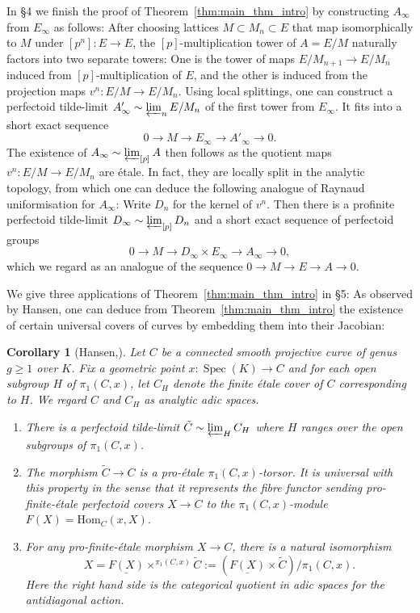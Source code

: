 \documentclass[10pt,oneside]{amsart}
\newtheorem{corollary}[theorem]{Corollary}
\theoremstyle{definition}
\newcommand{\Spec}{\operatorname{Spec}}
\begin{document}
In \S4 we finish the proof of Theorem~\ref{thm:main_thm_intro} by constructing $A_\infty$ from $E_\infty$ as follows: After choosing lattices $M\subset M_n\subset E$ that map isomorphically to $M$ under $[p^n]\colon E\rightarrow E$, the $[p]$-multiplication tower of $A=E/M$ naturally factors into two separate towers: One is the tower of maps $E/M_{n+1}\rightarrow E/M_n$ induced from $[p]$-multiplication of $E$, and the other is induced from the projection maps $v^n\colon E/M\rightarrow E/M_n$. Using local splittings, one can construct a perfectoid tilde-limit $A'_\infty\sim \varprojlim_n E/M_n$ of the first tower from $E_\infty$. It fits into a short exact sequence
\[0\to M\to E_\infty\to A'_\infty\to 0. \]
 The existence of $A_\infty\sim \varprojlim_{[p]}A$ then follows as the quotient maps $v^n\colon E/M\rightarrow E/M_n$ are \'etale. In fact, they are locally split in the analytic topology, from which one can deduce the following analogue of Raynaud uniformisation for $A_\infty$: Write $D_n$ for the kernel of $v^n$. Then there is a profinite perfectoid tilde-limit $D_\infty\sim \varprojlim_{[p]} D_n$ and a short exact sequence of perfectoid groups
\[0\rightarrow M\rightarrow D_\infty \times E_\infty \rightarrow A_\infty\rightarrow 0,\]
which we regard as an analogue of the sequence $0\rightarrow M\rightarrow E\rightarrow A\rightarrow 0$.

We give three applications of Theorem~\ref{thm:main_thm_intro} in \S 5:
As observed by Hansen, one can deduce from Theorem~\ref{thm:main_thm_intro} the existence of certain universal covers of curves by embedding them into their Jacobian:
	\begin{corollary}[Hansen,\cite{Hansen-blog}]
	Let $C$ be a connected smooth projective curve of genus $g\geq 1$ over $K$. Fix a geometric point $x\colon \Spec(K) \rightarrow C$ and for each open subgroup $H$ of $\pi_1(C,x)$, let $C_H$ denote the finite \'etale cover of $C$ corresponding to $H$. We regard $C$ and $C_H$ as analytic adic spaces.
	\begin{enumerate}
		\item There is a perfectoid tilde-limit $\tilde{C} \sim \varprojlim_{H}C_H$ where $H$ ranges over the open subgroups of $ \pi_1(C,x)$. 
		\item The morphism $\tilde{C}\to C$ is a pro-\'etale $\pi_1(C,x)$-torsor. It is universal with this property in the sense that it represents the fibre functor sending	 pro-finite-\'etale perfectoid covers $X\to C$ to the $\pi_1(C,x)$-module $F(X)=\mathrm{Hom}_C(x,X)$.
		\item For any pro-finite-\'etale morphism $X\to C$, there is a natural isomorphism
		\[ X = \underline{F(X)}\times^{\pi_1(C,x)}\tilde{C}:=(\underline{F(X)}\times \tilde{C})/\pi_1(C,x).\]
		Here the right hand side is the categorical quotient in adic spaces for the antidiagonal action.
	\end{enumerate}
\end{corollary}
\end{document}
